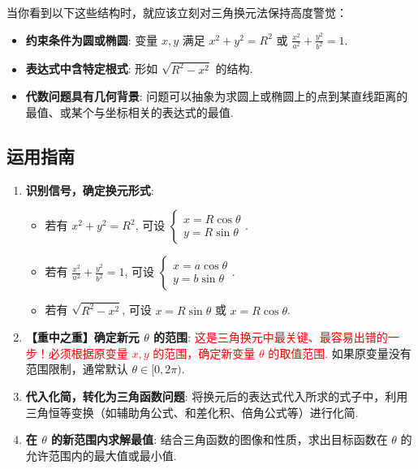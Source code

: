 \begin{note}[何时用三角换元？]
	当你看到以下这些结构时，就应该立刻对三角换元法保持高度警觉：
	\begin{itemize}
		\item \textbf{约束条件为圆或椭圆}: 变量 $x, y$ 满足 $x^2+y^2=R^2$ 或 $\frac{x^2}{a^2}+\frac{y^2}{b^2}=1$.
		\item \textbf{表达式中含特定根式}: 形如 $\sqrt{R^2-x^2}$ 的结构.
		\item \textbf{代数问题具有几何背景}: 问题可以抽象为求圆上或椭圆上的点到某直线距离的最值、或某个与坐标相关的表达式的最值.
	\end{itemize}
\end{note}

\subsection{运用指南}
\begin{enumerate}
	\item \textbf{识别信号，确定换元形式}:
	\begin{itemize}
		\item 若有 $x^2+y^2=R^2$, 可设 $\begin{cases} x = R\cos\theta \\ y = R\sin\theta \end{cases}$.
		\item 若有 $\frac{x^2}{a^2}+\frac{y^2}{b^2}=1$, 可设 $\begin{cases} x = a\cos\theta \\ y = b\sin\theta \end{cases}$.
		\item 若有 $\sqrt{R^2-x^2}$, 可设 $x = R\sin\theta$ 或 $x=R\cos\theta$.
	\end{itemize}
	\item \textbf{【重中之重】确定新元 $\theta$ 的范围}:
	\textcolor{red}{这是三角换元中最关键、最容易出错的一步！必须根据原变量 $x,y$ 的范围，确定新变量 $\theta$ 的取值范围.} 如果原变量没有范围限制，通常默认 $\theta \in [0, 2\pi)$.
	\item \textbf{代入化简，转化为三角函数问题}:
	将换元后的表达式代入所求的式子中，利用三角恒等变换（如辅助角公式、和差化积、倍角公式等）进行化简.
	\item \textbf{在 $\theta$ 的新范围内求解最值}:
	结合三角函数的图像和性质，求出目标函数在 $\theta$ 的允许范围内的最大值或最小值.
\end{enumerate}

